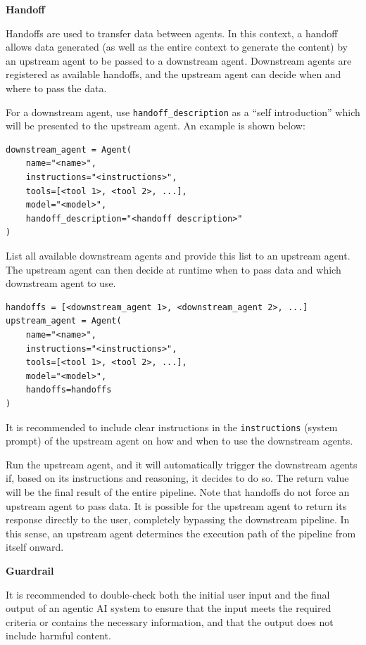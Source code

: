\vspace{0.1in}
\noindent \textbf{Handoff}
\vspace{0.1in}

Handoffs are used to transfer data between agents. In this context, a handoff allows data generated (as well as the entire context to generate the content) by an upstream agent to be passed to a downstream agent. Downstream agents are registered as available handoffs, and the upstream agent can decide when and where to pass the data.

For a downstream agent, use \verb|handoff_description| as a ``self introduction'' which will be presented to the upstream agent. An example is shown below:
\begin{lstlisting}
downstream_agent = Agent(
    name="<name>",
    instructions="<instructions>",
    tools=[<tool 1>, <tool 2>, ...],
    model="<model>",
    handoff_description="<handoff description>"
)
\end{lstlisting}

List all available downstream agents and provide this list to an upstream agent. The upstream agent can then decide at runtime when to pass data and which downstream agent to use.
\begin{lstlisting}
handoffs = [<downstream_agent 1>, <downstream_agent 2>, ...]
upstream_agent = Agent(
    name="<name>",
    instructions="<instructions>",
    tools=[<tool 1>, <tool 2>, ...],
    model="<model>",
    handoffs=handoffs
)
\end{lstlisting}

It is recommended to include clear instructions in the \verb|instructions| (system prompt) of the upstream agent on how and when to use the downstream agents.

Run the upstream agent, and it will automatically trigger the downstream agents if, based on its instructions and reasoning, it decides to do so. The return value will be the final result of the entire pipeline. Note that handoffs do not force an upstream agent to pass data. It is possible for the upstream agent to return its response directly to the user, completely bypassing the downstream pipeline. In this sense, an upstream agent determines the execution path of the pipeline from itself onward.

\vspace{0.1in}
\noindent \textbf{Guardrail}
\vspace{0.1in}

It is recommended to double-check both the initial user input and the final output of an agentic AI system to ensure that the input meets the required criteria or contains the necessary information, and that the output does not include harmful content.

